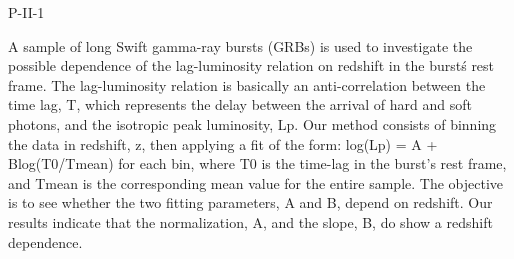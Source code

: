P-II-1


\bigskip



\bigskip

\noindent A sample of long Swift gamma-ray bursts (GRBs) is used to investigate the possible dependence of the lag-luminosity relation on redshift in the burst\'s rest frame. The lag-luminosity relation is basically an anti-correlation between the time lag, T, which represents the delay between the arrival of hard and soft photons, and the isotropic peak luminosity, Lp. Our method consists of binning the data in redshift, z, then applying a fit of the form: log(Lp) = A + Blog(T0/Tmean) for each bin, where T0 is the time-lag in the burst’s rest frame, and Tmean is the corresponding mean value for the entire sample. The objective is to see whether the two fitting parameters, A and B, depend on redshift. Our results indicate that the normalization, A, and the slope, B, do show a redshift dependence.

